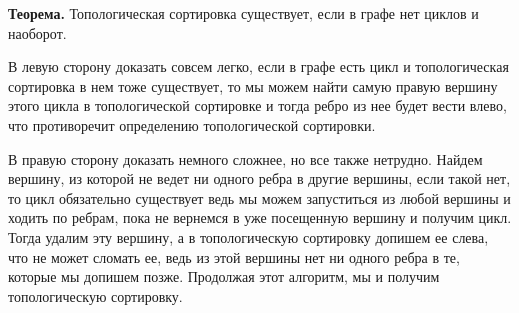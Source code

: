 \textbf{Теорема.} Топологическая сортировка существует, если в графе нет циклов и наоборот.

В левую сторону доказать совсем легко, если в графе есть цикл и топологическая сортировка в нем тоже существует, то мы можем найти самую правую вершину этого цикла в топологической сортировке и тогда ребро из нее будет вести влево, что противоречит определению топологической сортировки.

В правую сторону доказать немного сложнее, но все также нетрудно. Найдем вершину, из которой не ведет ни одного ребра в другие вершины, если такой нет, то цикл обязательно существует ведь мы можем запуститься из любой вершины и ходить по ребрам, пока не вернемся в уже посещенную вершину и получим цикл. Тогда удалим эту вершину, а в топологическую сортировку допишем ее слева, что не может сломать ее, ведь из этой вершины нет ни одного ребра в те, которые мы допишем позже. Продолжая этот алгоритм, мы и получим топологическую сортировку. 

